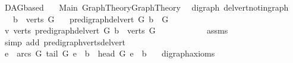 %
\begin{isabellebody}%
%
%
\isadelimtheory
\isanewline
\isanewline
\isanewline
%
\endisadelimtheory
%
\isatagtheory
{}\isamarkupfalse%
\ DAGbased\isanewline
\ \ \ Main\ Graph{\isacharunderscore}{\kern0pt}Theory{\isachardot}{\kern0pt}Graph{\isacharunderscore}{\kern0pt}Theory\isanewline
{}%
\endisatagtheory
{\isafoldtheory}%
%
\isadelimtheory
%
\endisadelimtheory
%
\isadelimdocument
%
\endisadelimdocument
%
\isatagdocument
%
\isamarkuptrue%
%
\endisatagdocument
{\isafolddocument}%
%
\isadelimdocument
%
\endisadelimdocument
{}\isamarkupfalse%
\ {\isacharparenleft}{\kern0pt}\ digraph{\isacharparenright}{\kern0pt}\ del{\isacharunderscore}{\kern0pt}vert{\isacharunderscore}{\kern0pt}not{\isacharunderscore}{\kern0pt}in{\isacharunderscore}{\kern0pt}graph{\isacharcolon}{\kern0pt}\isanewline
\ \ \ {\isachardoublequoteopen}b\ {\isasymnotin}\ verts\ G{\isachardoublequoteclose}\isanewline
\ \ \ {\isachardoublequoteopen}{\isacharparenleft}{\kern0pt}pre{\isacharunderscore}{\kern0pt}digraph{\isachardot}{\kern0pt}del{\isacharunderscore}{\kern0pt}vert\ G\ b{\isacharparenright}{\kern0pt}\ {\isacharequal}{\kern0pt}\ G{\isachardoublequoteclose}\isanewline
%
\isadelimproof
\ \ \ \ \ \ %
\endisadelimproof
%
\isatagproof
{}\isamarkupfalse%
\ {\isacharminus}{\kern0pt}\isanewline
\ \ \ \ \ \ \ \ \isamarkupfalse%
\ v{\isacharcolon}{\kern0pt}\ {\isachardoublequoteopen}verts\ {\isacharparenleft}{\kern0pt}pre{\isacharunderscore}{\kern0pt}digraph{\isachardot}{\kern0pt}del{\isacharunderscore}{\kern0pt}vert\ G\ b{\isacharparenright}{\kern0pt}\ {\isacharequal}{\kern0pt}\ verts\ G{\isachardoublequoteclose}\isanewline
\ \ \ \ \ \ \ \ \ \ \isamarkupfalse%
\ assms{\isacharparenleft}{\kern0pt}{}{\isacharparenright}{\kern0pt}\isanewline
\ \ \ \ \ \ \ \ \ \ \isamarkupfalse%
\ {\isacharparenleft}{\kern0pt}simp\ add{\isacharcolon}{\kern0pt}\ pre{\isacharunderscore}{\kern0pt}digraph{\isachardot}{\kern0pt}verts{\isacharunderscore}{\kern0pt}del{\isacharunderscore}{\kern0pt}vert{\isacharparenright}{\kern0pt}\ \isanewline
\ \ \ \ \ \ \ \ \isamarkupfalse%
\ {\isachardoublequoteopen}{\isasymforall}e\ {\isasymin}\ arcs\ G{\isachardot}{\kern0pt}\ tail\ G\ e\ {\isasymnoteq}\ b\ {\isasymand}\ head\ G\ e\ {\isasymnoteq}\ b\ {\isachardoublequoteclose}\ \isamarkupfalse%
\ digraph{\isacharunderscore}{\kern0pt}axioms\isanewline

\end{isabellebody}

